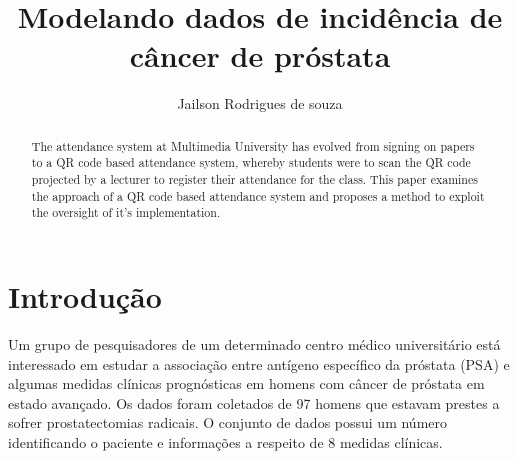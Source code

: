 \documentclass[runningheads]{llncs}\usepackage[]{graphicx}\usepackage[]{color}
\begin{document}
\title{Modelando dados de incidência de câncer de próstata}
%
\author{Jailson Rodrigues de souza}
%

%
%
\maketitle              %
%

\begin{abstract}
The attendance system at Multimedia University has evolved from signing on papers to a QR code based attendance system, whereby students were to scan the QR code projected by a lecturer to register their attendance for the class. This paper examines the approach of a QR code based attendance system and proposes a method to exploit the oversight of it's implementation. 
%
\end{abstract}
%

%
\section{Introdução}
Um grupo de pesquisadores de um determinado centro médico universitário está interessado em estudar a associação entre antígeno específico da próstata (PSA) e algumas medidas clínicas prognósticas em homens com câncer de próstata em estado avançado. Os dados foram coletados de 97 homens que estavam prestes a sofrer prostatectomias radicais. O conjunto de dados possui um número identificando o paciente e informações a respeito de 8 medidas clínicas.


%
%
\end{document}
